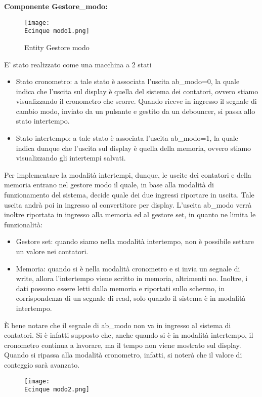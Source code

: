\documentclass[12pt]{article}
\def \Ecinque {Allegati/Esercizio5/}
\begin{document}
{\large \textbf{Componente Gestore\_modo:}}
\begin{figure}[ht]
    \centering
    \texttt{[image: \\Ecinque modo1.png]}
    \caption{Entity Gestore modo}
\end{figure}
\clearpage
E' stato realizzato come una macchina a 2 stati
\begin{itemize}
    \item Stato cronometro: a tale stato è associata l’uscita ab\_modo=0, la quale indica che l’uscita sul display è quella del sistema dei contatori, ovvero stiamo visualizzando il cronometro che scorre. Quando riceve in ingresso il segnale di cambio modo, inviato da un pulsante e gestito da un debouncer, si passa allo stato intertempo.
    \item Stato intertempo: a tale stato è associata l’uscita ab\_modo=1, la quale indica dunque che l’uscita sul display è quella della memoria, ovvero stiamo visualizzando gli intertempi salvati.
\end{itemize}
Per implementare la modalità intertempi, dunque, le uscite dei contatori e della memoria entrano nel gestore modo il quale, in base alla modalità di funzionamento del sistema, decide quale dei due ingressi riportare in uscita. Tale uscita andrà poi in ingresso al convertitore per display.
L’uscita ab\_modo verrà inoltre riportata in ingresso alla memoria ed al gestore set, in quanto ne limita le funzionalità:
\begin{itemize}
    \item Gestore set: quando siamo nella modalità intertempo, non è possibile settare un valore nei contatori.
    \item Memoria: quando si è nella modalità cronometro e si invia un segnale di write, allora l’intertempo viene scritto in memoria, altrimenti no. Inoltre, i dati possono essere letti dalla memoria e riportati sullo schermo, in corrispondenza di un segnale di read, solo quando il sistema è in modalità intertempo.
\end{itemize}
È bene notare che il segnale di ab\_modo non va in ingresso al sistema di contatori. Si è infatti supposto che, anche quando si è in modalità intertempo, il cronometro continua a lavorare, ma il tempo non viene mostrato sul display. Quando si ripassa alla modalità cronometro, infatti, si noterà che il valore di conteggio sarà avanzato.
\begin{figure}[ht!]
    \texttt{[image: \\Ecinque modo2.png]}
\end{figure}
\end{document}
